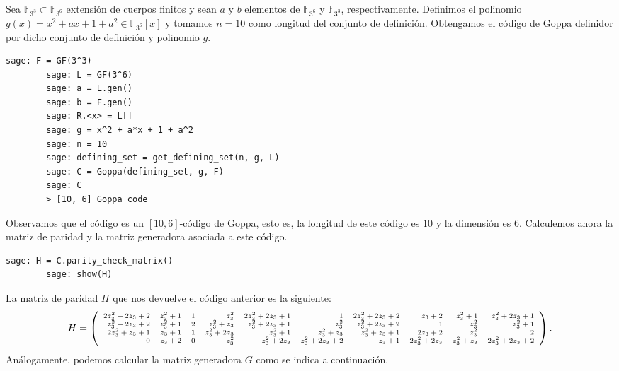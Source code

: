 \begin{exampleth}
    \label{ex:goppa-3_3}
    Sea $\mathbb{F}_{3^3} \subset \mathbb{F}_{3^6}$ extensión de cuerpos finitos y sean $a$ y $b$ elementos de $\mathbb{F}_{3^6}$ y $\mathbb{F}_{3^3}$, respectivamente. Definimos el polinomio $g(x) = x^2 + ax + 1 + a^2 \in \mathbb{F}_{3^6}[x]$ y tomamos $n = 10$ como longitud del conjunto de definición. Obtengamos el código de Goppa definidor por dicho conjunto de definición y polinomio $g$.

    \begin{lstlisting}[gobble=4]
        sage: F = GF(3^3)
        sage: L = GF(3^6)
        sage: a = L.gen()
        sage: b = F.gen()
        sage: R.<x> = L[]
        sage: g = x^2 + a*x + 1 + a^2
        sage: n = 10
        sage: defining_set = get_defining_set(n, g, L)
        sage: C = Goppa(defining_set, g, F)
        sage: C
        > [10, 6] Goppa code
    \end{lstlisting}
    
    Observamos que el código es un $[10, 6]$-código de Goppa, esto es, la longitud de este código es $10$ y la dimensión es $6$. Calculemos ahora la matriz de paridad y la matriz generadora asociada a este código.

    \begin{lstlisting}[gobble=4]
        sage: H = C.parity_check_matrix()
        sage: show(H)
    \end{lstlisting}

    La matriz de paridad $H$ que nos devuelve el código anterior es la siguiente:
    \[\scriptsize
        H = 
        \left(\begin{array}{rrrrrrrrrr}
        2 z_{3}^{2} + 2 z_{3} + 2 & z_{3}^{2} + 1 & 1 & z_{3}^{2} & 2 z_{3}^{2} + 2 z_{3} + 1 & 1 & 2 z_{3}^{2} + 2 z_{3} + 2 & z_{3} + 2 & z_{3}^{2} + 1 & z_{3}^{2} + 2 z_{3} + 1 \\
        z_{3}^{2} + 2 z_{3} + 2 & z_{3}^{2} + 1 & 2 & z_{3}^{2} + z_{3} & z_{3}^{2} + 2 z_{3} + 1 & z_{3}^{2} & z_{3}^{2} + 2 z_{3} + 2 & 1 & z_{3}^{2} & z_{3}^{2} + 1 \\
        2 z_{3}^{2} + z_{3} + 1 & z_{3} + 1 & 1 & z_{3}^{2} + 2 z_{3} & z_{3}^{2} + 1 & z_{3}^{2} + z_{3} & z_{3}^{2} + z_{3} + 1 & 2 z_{3} + 2 & z_{3}^{2} & 2 \\
        0 & z_{3} + 2 & 0 & z_{3}^{2} & z_{3}^{2} + 2 z_{3} & z_{3}^{2} + 2 z_{3} + 2 & z_{3} + 1 & 2 z_{3}^{2} + 2 z_{3} & z_{3}^{2} + z_{3} & 2 z_{3}^{2} + 2 z_{3} + 2
        \end{array}\right).
    \]
    Análogamente, podemos calcular la matriz generadora $G$ como se indica a continuación.


\end{exampleth}
